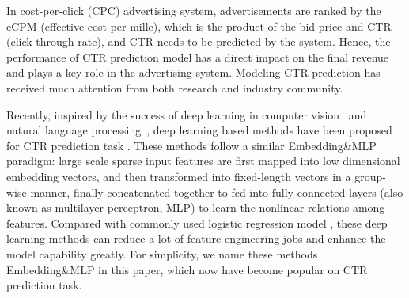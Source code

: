 In cost-per-click (CPC) advertising system, advertisements are ranked by the eCPM (effective cost per mille), which is the product of the bid price and CTR (click-through rate), and CTR needs to be predicted by the system. Hence, the performance of CTR prediction model has a direct impact on the final revenue and plays a key role in the advertising system. Modeling CTR prediction has received much attention from both research and industry community.

Recently, inspired by the success of deep learning in computer vision~\cite{huang2016densely} and natural language processing~\cite{bengio:attention}, deep learning based methods have been proposed for CTR prediction task \cite{deep_crossing,youtube:recommend,deep_intent,widedeep}.
These methods follow a similar Embedding\&MLP paradigm: large scale sparse input features are first mapped into low dimensional embedding vectors, and then transformed into fixed-length vectors in a group-wise manner, finally concatenated together to fed into fully connected layers (also known as multilayer perceptron, MLP) to learn the nonlinear relations among features. 
Compared with commonly used logistic regression model \cite{ftrl}, these deep learning methods can reduce a lot of feature engineering jobs and enhance the model capability greatly. For simplicity, we name these methods Embedding\&MLP in this paper, which now have become popular on CTR prediction task.

